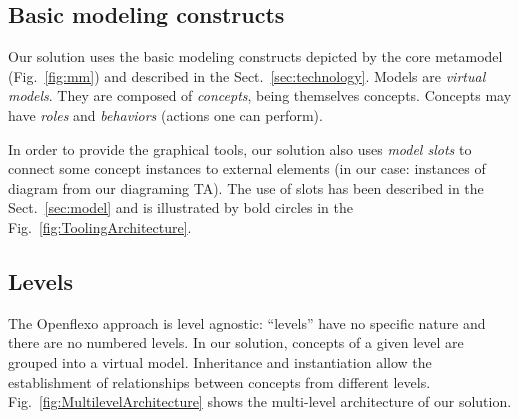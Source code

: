   \subsection{Basic modeling constructs}

  Our solution uses the basic modeling constructs depicted by the \FML core
  metamodel (Fig.~\ref{fig:mm}) and described in
  the Sect.~\ref{sec:technology}. Models are \emph{virtual models}. They are
  composed of \emph{concepts}, being themselves concepts. Concepts may have
  \emph{roles} and \emph{behaviors} (actions one can perform).

  In order to provide the graphical tools, our solution also uses \emph{model
  slots} to connect some concept instances to external elements (in our case:
  instances of diagram from our diagraming TA). The use of slots has been
  described in the Sect.~\ref{sec:model} and is illustrated by bold circles in
  the Fig.~\ref{fig:ToolingArchitecture}.


  \subsection{Levels}


  The Openflexo approach is level agnostic: ``levels'' have no specific nature
  and there are no numbered levels. In our solution, concepts of a given level
  are grouped into a virtual model. Inheritance and instantiation allow the
  establishment of relationships between concepts from different levels.
Fig.~\ref{fig:MultilevelArchitecture} shows the multi-level architecture of
our solution.



